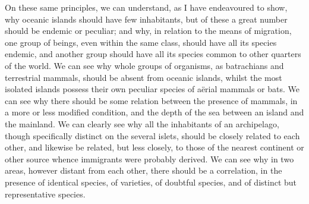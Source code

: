 \indent On these same principles, we can understand, as I have endeavoured to show, why oceanic islands should have few inhabitants, but of these a great number should be endemic or peculiar; and why, in relation to the means of migration, one group of beings, even within the same class, should have all its species endemic, and another group should have all its species common to other quarters of the world. We can see why whole groups of organisms, as batrachians and terrestrial mammals, should be absent from oceanic islands, whilst the most isolated islands possess their own peculiar species of a\"{e}rial mammals or bats.  We can see why there should be some relation between the presence of mammals, in a more or less modified condition, and the depth of the sea between an island and the mainland. We can clearly see why all the inhabitants of an archipelago, though specifically distinct on the several islets, should be closely related to each other, and likewise be related, but less closely, to those of the nearest continent or other source whence immigrants were probably derived. We can see why in two areas, however distant from each other, there should be a correlation, in the presence of identical species, of varieties, of doubtful species, and of distinct but representative species.~\\
